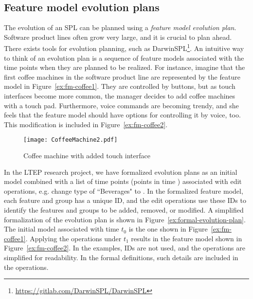 \subsection{Feature model evolution plans}
\label{sub:feature-model-evolution-plans}
The evolution of an SPL can be planned using a \emph{feature model evolution plan}. Software product lines often grow very large, and it is crucial to plan ahead. There exists tools for evolution planning, such as DarwinSPL\footnote{\url{https://gitlab.com/DarwinSPL/DarwinSPL}}. An intuitive way to think of an evolution plan is a sequence of feature models associated with the time points when they are planned to be realized. For instance, imagine that the first coffee machines in the software product line are represented by the feature model in Figure~\vref{ex:fm-coffee1}. They are controlled by buttons, but as touch interfaces become more common, the manager decides to add coffee machines with a touch pad. Furthermore, voice commands are becoming trendy, and she feels that the feature model should have options for controlling it by voice, too. This modification is included in Figure~\vref{ex:fm-coffee2}.

\begin{figure}
   \begin{center}
      \texttt{[image: CoffeeMachine2.pdf]}
   \end{center}
   \caption[Coffee machine with added touch interface]{Coffee machine with added touch interface \footnotemark}
   \label{ex:fm-coffee2}
\end{figure}


In the LTEP research project, we have formalized evolution plans as an initial model combined with a list of time points (points in time ) associated with edit operations, e.g. change type of ``Beverages" to \optional{}. In the formalized feature model, each feature and group has a unique ID, and the edit operations use these IDs to identify the features and groups to be added, removed, or modified. A simplified formalization of the evolution plan is shown in Figure~\vref{ex:formal-evolution-plan}. The initial model associated with time $t_0$ is the one shown in Figure~\vref{ex:fm-coffee1}. Applying the operations under $t_1$ results in the feature model shown in Figure~\vref{ex:fm-coffee2}. In the examples, IDs are not used, and the operations are simplified for readability. In the formal definitions, such details are included in the operations.

